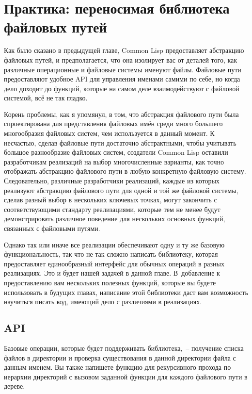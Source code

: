 \chapter{Практика: переносимая библиотека файловых путей}
\label{ch:15}

\thispagestyle{empty}

Как было сказано в предыдущей главе, Common Lisp предоставляет абстракцию файловых путей,
и предполагается, что она изолирует вас от деталей того, как различные операционные и
файловые системы именуют файлы. Файловые пути предоставляют удобное API для управления
именами самими по себе, но когда дело доходит до функций, которые на самом деле
взаимодействуют с файловой системой, всё не так гладко.

Корень проблемы, как я упомянул, в том, что абстракция файлового пути была спроектирована
для представления файловых имён среди много большего многообразия файловых систем, чем
используется в данный момент. К несчастью, сделав файловые пути достаточно абстрактными,
чтобы учитывать большое разнообразие файловых систем, создатели Common Lisp оставили
разработчикам реализаций на выбор многочисленные варианты, как точно отображать абстракцию
файлового пути в любую конкретную файловую систему. Следовательно, различные разработчики
реализаций, каждые из которых реализуют абстракцию файлового пути для одной и той же
файловой системы, сделав разный выбор в нескольких ключевых точках, могут закончить с
соответствующими стандарту реализациями, которые тем не менее будут демонстрировать
различное поведение для нескольких основных функций, связанных с файловыми путями.

Однако так или иначе все реализации обеспечивают одну и ту же базовую функ\-цио\-наль\-ность,
так что не так сложно написать библиотеку, которая предоставляет единообразный интерфейс
для обычных операций в разных реализациях. Это и будет нашей задачей в данной главе.
В~добавление к предоставлению вам нескольких полезных функций, которые вы будете
использовать в будущих главах, написание этой библиотеки даст вам возможность научиться
писать код, имеющий дело с различиями в реализациях.

\section{API}

Базовые операции, которые будет поддерживать библиотека,~-- получение списка файлов в
директории и проверка существования в данной директории файла с данным именем. Вы также
напишете функцию для рекурсивного прохода по иерархии директорий с вызовом заданной
функции для каждого файлового пути в дереве.

